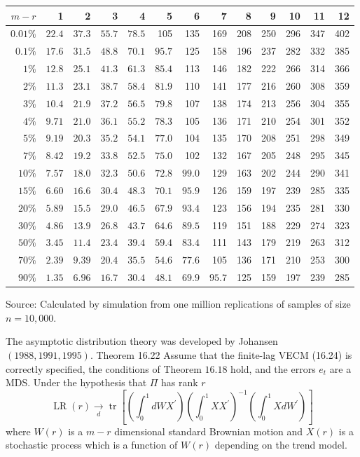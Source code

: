 \documentclass[10pt]{article}
\begin{document}
\begin{tabular}{rrrrrrrrrrrrr}
$m-r$ & 1 & 2 & 3 & 4 & 5 & 6 & 7 & 8 & 9 & 10 & 11 & 12 \\
\hline
$0.01 \%$ & $22.4$ & $37.3$ & $55.7$ & $78.5$ & 105 & 135 & 169 & 208 & 250 & 296 & 347 & 402 \\
$0.1 \%$ & $17.6$ & $31.5$ & $48.8$ & $70.1$ & $95.7$ & 125 & 158 & 196 & 237 & 282 & 332 & 385 \\
$1 \%$ & $12.8$ & $25.1$ & $41.3$ & $61.3$ & $85.4$ & 113 & 146 & 182 & 222 & 266 & 314 & 366 \\
$2 \%$ & $11.3$ & $23.1$ & $38.7$ & $58.4$ & $81.9$ & 110 & 141 & 177 & 216 & 260 & 308 & 359 \\
$3 \%$ & $10.4$ & $21.9$ & $37.2$ & $56.5$ & $79.8$ & 107 & 138 & 174 & 213 & 256 & 304 & 355 \\
$4 \%$ & $9.71$ & $21.0$ & $36.1$ & $55.2$ & $78.3$ & 105 & 136 & 171 & 210 & 254 & 301 & 352 \\
$5 \%$ & $9.19$ & $20.3$ & $35.2$ & $54.1$ & $77.0$ & 104 & 135 & 170 & 208 & 251 & 298 & 349 \\
$7 \%$ & $8.42$ & $19.2$ & $33.8$ & $52.5$ & $75.0$ & 102 & 132 & 167 & 205 & 248 & 295 & 345 \\
$10 \%$ & $7.57$ & $18.0$ & $32.3$ & $50.6$ & $72.8$ & $99.0$ & 129 & 163 & 202 & 244 & 290 & 341 \\
$15 \%$ & $6.60$ & $16.6$ & $30.4$ & $48.3$ & $70.1$ & $95.9$ & 126 & 159 & 197 & 239 & 285 & 335 \\
$20 \%$ & $5.89$ & $15.5$ & $29.0$ & $46.5$ & $67.9$ & $93.4$ & 123 & 156 & 194 & 235 & 281 & 330 \\
$30 \%$ & $4.86$ & $13.9$ & $26.8$ & $43.7$ & $64.6$ & $89.5$ & 119 & 151 & 188 & 229 & 274 & 323 \\
$50 \%$ & $3.45$ & $11.4$ & $23.4$ & $39.4$ & $59.4$ & $83.4$ & 111 & 143 & 179 & 219 & 263 & 312 \\
$70 \%$ & $2.39$ & $9.39$ & $20.4$ & $35.5$ & $54.6$ & $77.6$ & 105 & 136 & 171 & 210 & 253 & 300 \\
$90 \%$ & $1.35$ & $6.96$ & $16.7$ & $30.4$ & $48.1$ & $69.9$ & $95.7$ & 125 & 159 & 197 & 239 & 285 \\
\hline
\end{tabular}

Source: Calculated by simulation from one million replications of samples of size $n=10,000$.

The asymptotic distribution theory was developed by Johansen $(1988,1991,1995)$. Theorem 16.22 Assume that the finite-lag VECM (16.24) is correctly specified, the conditions of Theorem $16.18$ hold, and the errors $e_{t}$ are a MDS. Under the hypothesis that $\Pi$ has rank $r$
$$
\operatorname{LR}(r) \underset{d}{\longrightarrow} \operatorname{tr}\left[\left(\int_{0}^{1} d W X^{\prime}\right)\left(\int_{0}^{1} X X^{\prime}\right)^{-1}\left(\int_{0}^{1} X d W^{\prime}\right)\right]
$$
where $W(r)$ is a $m-r$ dimensional standard Brownian motion and $X(r)$ is a stochastic process which is a function of $W(r)$ depending on the trend model.
\end{document}
